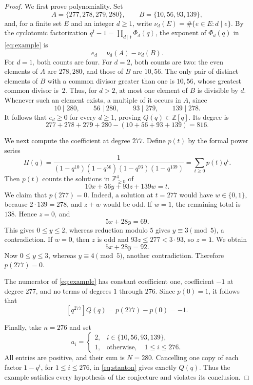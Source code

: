 \documentclass[11pt]{article}
\newcommand{\NN}{\mathbb Z_{\geq0}}
\begin{document}
\begin{proof}
We first prove polynomiality. Set
\[
 A=\{277,278,279,280\},\qquad B=\{10,56,93,139\},
\]
and, for a finite set $E$ and an integer $d\geq1$, write
$\nu_d(E)=\#\{e\in E:d\mid e\}$. By the cyclotomic factorization
$q^t-1=\prod_{d\mid t}\Phi_d(q)$, the exponent of $\Phi_d(q)$ in
\eqref{eq:example} is
\[
 e_d=\nu_d(A)-\nu_d(B).
\]
For $d=1$, both counts are four. For $d=2$, both counts are two:
the even elements of $A$ are $278,280$, and those of $B$ are $10,56$.
The only pair of distinct elements of $B$ with a common divisor greater
than one is $10,56$, whose greatest common divisor is~$2$.
Thus, for $d>2$, at most one element of $B$ is divisible by $d$.
Whenever such an element exists, a multiple of it occurs in $A$, since
\[
 10\mid280,\qquad 56\mid280,\qquad 93\mid279,\qquad 139\mid278.
\]
It follows that $e_d\geq0$ for every $d\geq1$, proving
$Q(q)\in\mathbb Z[q]$. Its degree is
\[
 277+278+279+280-(10+56+93+139)=816.
\]

We next compute the coefficient at degree $277$. Define $p(t)$ by the
formal power series
\[
 H(q)=\frac1{(1-q^{10})(1-q^{56})(1-q^{93})(1-q^{139})}
     =\sum_{t\geq0}p(t)q^t.
\]
Then $p(t)$ counts the solutions in $\NN^4$ of
\[
 10x+56y+93z+139w=t.
\]
We claim that $p(277)=0$. Indeed, a solution at $t=277$ would have
$w\in\{0,1\}$, because $2\cdot139=278$, and $z+w$ would be odd.
If $w=1$, the remaining total is $138$. Hence $z=0$, and
\[
 5x+28y=69.
\]
This gives $0\leq y\leq2$, whereas reduction modulo $5$ gives
$y\equiv3\pmod5$, a contradiction. If $w=0$, then $z$ is odd and
$93z\leq277<3\cdot93$, so $z=1$. We obtain
\[
 5x+28y=92.
\]
Now $0\leq y\leq3$, whereas $y\equiv4\pmod5$, another contradiction.
Therefore $p(277)=0$.

The numerator of \eqref{eq:example} has constant coefficient one,
coefficient $-1$ at degree $277$, and no terms of degrees $1$ through
$276$. Since $p(0)=1$, it follows that
\[
 [q^{277}]Q(q)=p(277)-p(0)=-1.
\]

Finally, take $n=276$ and set
\[
 a_i=\begin{cases}
 2,&i\in\{10,56,93,139\},\\
 1,&\text{otherwise},\quad 1\leq i\leq276.
 \end{cases}
\]
All entries are positive, and their sum is $N=280$.
Cancelling one copy of each factor $1-q^i$, for $1\leq i\leq276$,
in \eqref{eq:stanton} gives exactly $Q(q)$. Thus the example satisfies
every hypothesis of the conjecture and violates its conclusion.
\end{proof}
\end{document}
